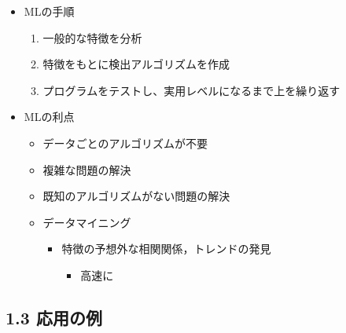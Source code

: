\begin{itemize}
\tightlist
\item
  MLの手順

  \begin{enumerate}
  \def\labelenumi{\arabic{enumi}.}
  \tightlist
  \item
    一般的な特徴を分析
  \item
    特徴をもとに検出アルゴリズムを作成
  \item
    プログラムをテストし、実用レベルになるまで上を繰り返す
  \end{enumerate}
\item
  MLの利点

  \begin{itemize}
  \tightlist
  \item
    データごとのアルゴリズムが不要
  \item
    複雑な問題の解決
  \item
    既知のアルゴリズムがない問題の解決
  \item
    データマイニング

    \begin{itemize}
    \tightlist
    \item
      特徴の予想外な相関関係，トレンドの発見

      \begin{itemize}
      \tightlist
      \item
        高速に
      \end{itemize}
    \end{itemize}
  \end{itemize}
\end{itemize}

\hypertarget{ux5fdcux7528ux306eux4f8b}{%
\subsection{1.3 応用の例}\label{ux5fdcux7528ux306eux4f8b}}

